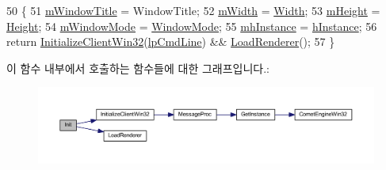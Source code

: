 \begin{DoxyCode}
50 \{
51     \hyperlink{class_comet_engine_1_1_comet_engine_win32_a63ee29dd5d917889a0e7b644fea26d06}{mWindowTitle} = WindowTitle;
52     \hyperlink{class_comet_engine_1_1_comet_engine_win32_a954be7feb8f6558f86a08a30d640013e}{mWidth}         = \hyperlink{_d_l_l_comet_engine_win32_8cpp_abbe7749c3b402f7dfe64f936774cfcd4}{Width};
53     \hyperlink{class_comet_engine_1_1_comet_engine_win32_ae5ce9d2610ee7e9675a4ecc74b0c9492}{mHeight}       = \hyperlink{_d_l_l_comet_engine_win32_8cpp_afd53bc431b967813e00ae3cfecd5c548}{Height};
54     \hyperlink{class_comet_engine_1_1_comet_engine_win32_a31fa5cdc3ed0a81919f9ae7ec61844d1}{mWindowMode}  = \hyperlink{_d_l_l_comet_engine_win32_8cpp_a319b6c977f6b5f638f8246c67a367768}{WindowMode};
55     \hyperlink{class_comet_engine_1_1_comet_engine_win32_a699a17c72a7b5416a8966df051f9c752}{mhInstance}     = \hyperlink{_d_l_l_comet_engine_win32_8cpp_a5fb685beb2aed3ecdbad03b352111398}{hInstance};
56     \textcolor{keywordflow}{return} \hyperlink{class_comet_engine_1_1_comet_engine_win32_a9f5ac1f01164dfdb7f752e6b4f77e80a}{InitializeClientWin32}(\hyperlink{_d_l_l_comet_engine_win32_8cpp_af1ff5ad877f6069d41720b03c7769227}{lpCmdLine}) && 
      \hyperlink{class_comet_engine_1_1_comet_engine_win32_a35f30fb8a7991557468d2fc3b25ff0b7}{LoadRenderer}();
57 \}
\end{DoxyCode}
이 함수 내부에서 호출하는 함수들에 대한 그래프입니다.\+:\nopagebreak
\begin{figure}[H]
\begin{center}
\leavevmode
\includegraphics[width=350pt]{class_comet_engine_1_1_comet_engine_win32_a1663bd9ecefc952f3f74065a592ad663_cgraph}
\end{center}
\end{figure}
\mbox{\label{class_comet_engine_1_1_comet_engine_win32_a9f5ac1f01164dfdb7f752e6b4f77e80a}} 
